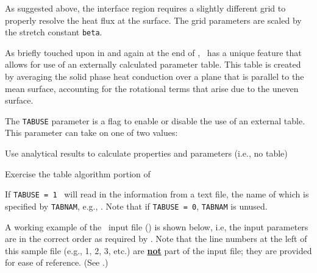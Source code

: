  As suggested above, the interface region requires a slightly different grid to properly resolve the heat flux at the surface. The grid parameters are scaled by the stretch constant \texttt{beta}.


As briefly touched upon in  and again at the end of , \Rocburn\ has a unique feature that allows for use of an externally calculated parameter table. This table is created by averaging the solid phase heat conduction over a plane that is parallel to the mean surface, accounting for the rotational terms that arise due to the uneven surface.

 The \texttt{TABUSE} parameter is a flag to enable or disable the use of an external table. This parameter can take on one of two values:

\begin{description}[labelindent=1cm]
\item[0]{Use analytical results to calculate properties and parameters (i.e., no table)}
\item[1]{Exercise the table algorithm portion of \Rocburn}
\end{description}

If \texttt{TABUSE = 1} \Rocburn\ will read in the information from a text file, the name of which is specified by \texttt{TABNAM}, e.g., . Note that if \texttt{TABUSE = 0}, \texttt{TABNAM} is unused.


A working example of the \Rocburn\ input file () is shown below, i.e, the input parameters are in the correct order as required by \Rocburn. Note that the line numbers at the left of this sample file (e.g., 1, 2, 3, etc.) are \underline{{\bf not}} part of the input file; they are provided for ease of reference. (See .)

